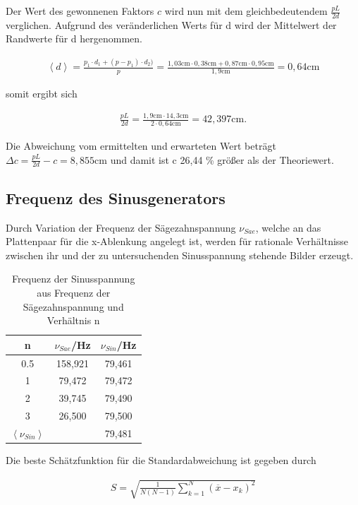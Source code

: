 Der Wert des gewonnenen Faktors $c$ wird nun mit dem gleichbedeutendem $\frac{pL}{2d}$ verglichen.
Aufgrund des veränderlichen Werts für d wird der Mittelwert der Randwerte für d hergenommen.

\begin{align}
 \left< d \right> = \frac{p_1 \cdot d_1 + (p-p_1) \cdot d_2)}{p} = \frac{1,03\text{cm} \cdot 0,38\text{cm} + 0,87\text{cm} \cdot 0,95\text{cm}}{1,9\text{cm}} = 0,64 \text{cm}
\end{align}

somit ergibt sich

\begin{align}
 \frac{pL}{2d} = \frac{1,9\text{cm} \cdot 14,3\text{cm}}{2 \cdot 0,64\text{cm}} = 42,397 \text{cm}.
\end{align}

Die Abweichung vom ermittelten und erwarteten Wert beträgt $\Delta c = \frac{pL}{2d} - c = 8,855 \text{cm}$ und damit ist
c 26,44 \% größer als der Theoriewert.

\subsection{Frequenz des Sinusgenerators}
Durch Variation der Frequenz der Sägezahnspannung $\nu_{Sae}$, welche an das Plattenpaar für die x-Ablenkung angelegt ist,
werden für rationale Verhältnisse zwischen ihr und der zu untersuchenden Sinusspannung stehende Bilder erzeugt.
\renewcommand{\arraystretch}{1.5}
\begin{table}[htbp]
 \centering
\begin{tabular}{c|c|c}
n & $\nu_{Sae}$/Hz & $\nu_{Sin}$/Hz\\
\hline
0.5 & 158,921 & 79,461 \\
1 & 79,472 & 79,472 \\
2 & 39,745 & 79,490 \\
3 & 26,500 & 79,500 \\
\hline
$\left< \nu_{Sin} \right>$ &   & 79,481\\
\end{tabular}
 \caption{Frequenz der Sinusspannung aus Frequenz der Sägezahnspannung und Verhältnis n}
\end{table}
\renewcommand{\arraystretch}{1}

Die beste Schätzfunktion für die Standardabweichung ist gegeben durch

\begin{align}
 S = \sqrt{\frac{1}{N(N-1)} \sum_{k=1}^N (\overline{x} - x_k)^2}
\end{align}

